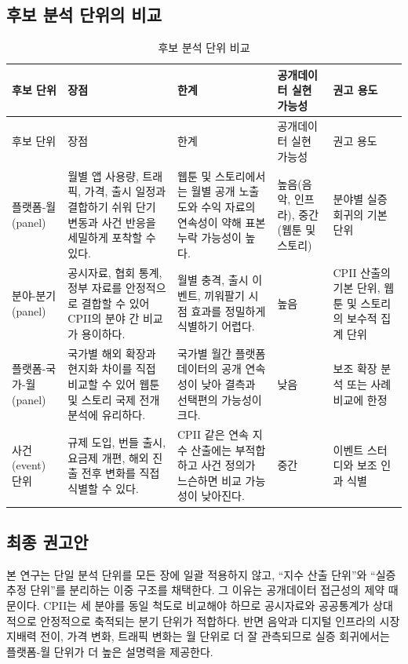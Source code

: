 \documentclass[11pt,a4paper]{report}
\begin{document}
\subsection{후보 분석 단위의 비교}
\small
\begin{longtable}{L{2.4cm}L{2.7cm}L{2.8cm}L{2.2cm}L{3.0cm}}
\caption{후보 분석 단위 비교} \\
\toprule
{}
후보 단위 & 장점 & 한계 & 공개데이터 실현 가능성 & 권고 용도 \\
\midrule
\endfirsthead
\toprule
{}
후보 단위 & 장점 & 한계 & 공개데이터 실현 가능성 & 권고 용도 \\
\midrule
\endhead
플랫폼-월(panel) & 월별 앱 사용량, 트래픽, 가격, 출시 일정과 결합하기 쉬워 단기 변동과 사건 반응을 세밀하게 포착할 수 있다. & 웹툰 및 스토리에서는 월별 공개 노출도와 수익 자료의 연속성이 약해 표본 누락 가능성이 높다. & 높음(음악, 인프라), 중간(웹툰 및 스토리) & 분야별 실증 회귀의 기본 단위 \\
분야-분기(panel) & 공시자료, 협회 통계, 정부 자료를 안정적으로 결합할 수 있어 CPII의 분야 간 비교가 용이하다. & 월별 충격, 출시 이벤트, 끼워팔기 시점 효과를 정밀하게 식별하기 어렵다. & 높음 & CPII 산출의 기본 단위, 웹툰 및 스토리의 보수적 집계 단위 \\
플랫폼-국가-월(panel) & 국가별 해외 확장과 현지화 차이를 직접 비교할 수 있어 웹툰 및 스토리 국제 전개 분석에 유리하다. & 국가별 월간 플랫폼 데이터의 공개 연속성이 낮아 결측과 선택편의 가능성이 크다. & 낮음 & 보조 확장 분석 또는 사례 비교에 한정 \\
사건(event) 단위 & 규제 도입, 번들 출시, 요금제 개편, 해외 진출 전후 변화를 직접 식별할 수 있다. & CPII 같은 연속 지수 산출에는 부적합하고 사건 정의가 느슨하면 비교 가능성이 낮아진다. & 중간 & 이벤트 스터디와 보조 인과 식별 \\
\bottomrule
\end{longtable}
\normalsize

\subsection{최종 권고안}
본 연구는 단일 분석 단위를 모든 장에 일괄 적용하지 않고, ``지수 산출 단위''와 ``실증 추정 단위''를 분리하는 이중 구조를 채택한다. 그 이유는 공개데이터 접근성의 제약 때문이다. CPII는 세 분야를 동일 척도로 비교해야 하므로 공시자료와 공공통계가 상대적으로 안정적으로 축적되는 분기 단위가 적합하다. 반면 음악과 디지털 인프라의 시장 지배력 전이, 가격 변화, 트래픽 변화는 월 단위로 더 잘 관측되므로 실증 회귀에서는 플랫폼-월 단위가 더 높은 설명력을 제공한다.
\end{document}
